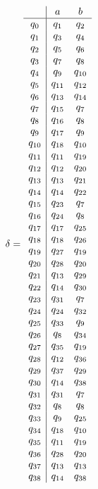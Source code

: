 \documentclass[11pt]{article} %
\begin{document}
\begin{enumerate}
\begin{eqnarray*}
\delta = \begin{array} {c | c c} &a & b\\ \hline q_0 & q_1 & q_2\\ q_1 & q_3 & q_4 \\ q_2 & q_5 & q_6\\ q_3 & q_7 & q_8\\ q_4 & q_9 & q_{10}\\ q_5 & q_{11} & q_{12}\\ q_6 & q_{13} & q_{14}\\ q_7 & q_{15} & q_7\\ q_8 & q_{16} & q_8\\ q_9 & q_{17} & q_9\\ q_{10} & q_{18} & q_{10}\\ q_{11} & q_{11} & q_{19}\\ q_{12} & q_{12} & q_{20}\\ q_{13} & q_{13} & q_{21}\\ q_{14} & q_{14} & q_{22}\\ q_{15} & q_{23} & q_7\\ q_{16} & q_{24} & q_8\\ q_{17} & q_{17} & q_{25}\\ q_{18} & q_{18} & q_{26}\\ q_{19} & q_{27} & q_{19}\\ q_{20} & q_{28} & q_{20}\\ q_{21} & q_{13} & q_{29}\\ q_{22} & q_{14} & q_{30}\\ q_{23} & q_{31} & q_7\\ q_{24} & q_{24} & q_{32}\\ q_{25} & q_{33} & q_9\\ q_{26} & q_8 & q_{34}\\ q_{27} & q_{35} & q_{19}\\ q_{28} & q_{12} & q_{36}\\ q_{29} & q_{37} & q_{29}\\ q_{30} & q_{14} & q_{38}\\ q_{31} & q_{31} & q_7\\ q_{32} & q_8 & q_8\\ q_{33} & q_9 & q_{25}\\ q_{34} & q_{18} & q_{10}\\ q_{35} & q_{11} & q_{19}\\ q_{36} & q_{28} & q_{20}\\ q_{37} & q_{13} & q_{13}\\ q_{38} & q_{14} & q_{38}\\\end{array}
\end{eqnarray*}






\end{enumerate}
\end{document}
